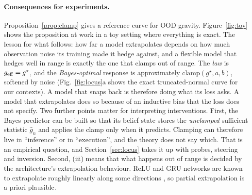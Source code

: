 \paragraph{Consequences for experiments.} Proposition~\ref{prop:clamp} gives a reference curve
for OOD gravity. Figure~\ref{fig:toy} shows the proposition at work in a toy setting where
everything is exact. The lesson for what follows: how far a model extrapolates depends on how
much observation noise its training made it hedge against, and a flexible model that hedges well
in range is exactly the one that clamps out of range. The \emph{law} is $g_{\rm eff} = g^\star$, and the \emph{Bayes-optimal}
response is approximately $\mathrm{clamp}(g^\star, a, b)$, softened by noise
(Fig.~\ref{fig:locus}a shows the exact truncated-normal curve for our contexts). A model that
snaps back is therefore doing what its loss asks. A model that extrapolates does so because of an
inductive bias that the loss does not specify. Two further points matter for interpreting
interventions. First, the Bayes predictor can be built so that its belief state stores the
\emph{unclamped} sufficient statistic $\hat g_n$ and applies the clamp only when it predicts.
Clamping can therefore live in ``inference'' or in ``execution'', and the theory does not say
which. That is an empirical question, and Section~\ref{sec:locus} takes it up with probes,
steering and inversion. Second, (iii) means that what happens out of range is decided by the architecture's
extrapolation behaviour. ReLU and GRU networks are known to extrapolate roughly linearly along
some directions \citep{xu2021extrapolate}, so partial extrapolation is a priori plausible.
